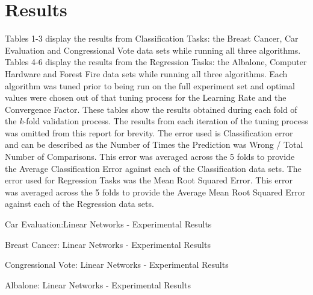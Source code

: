 \documentclass[twoside,11pt]{article}
\begin{document}
\newpage

\section{Results}
Tables 1-3 display the results from Classification Tasks: the Breast Cancer, Car Evaluation and Congressional Vote data sets while running all three algorithms. Tables 4-6 display the results from the Regression Tasks: the Albalone, Computer Hardware and Forest Fire data sets while running all three algorithms. Each algorithm was tuned prior to being run on the full experiment set and optimal values were chosen out of that tuning process for the Learning Rate and the Convergence Factor. These tables show the results obtained during each fold of the \textit{k}-fold validation process. The results from each iteration of the tuning process was omitted from this report for brevity. The error used is Classification error and can be described as the Number of Times the Prediction was Wrong / Total Number of Comparisons. This error was averaged across the 5 folds to provide the Average Classification Error against each of the Classification data sets. The error used for Regression Tasks was the Mean Root Squared Error. This error was averaged across the 5 folds to provide the Average Mean Root Squared Error against each of the Regression data sets.\newline


\begin{table}[h]
		\centering
		\caption{Car Evaluation:Linear Networks - Experimental Results}
		\label{tab:table1}
\end{table}

\begin{table}[h]
		\centering
		\caption{Breast Cancer: Linear Networks - Experimental Results}
		\label{tab:table2}
\end{table}
\newpage

\begin{table}[h]
		\centering
		\caption{Congressional Vote: Linear Networks - Experimental Results}
		\label{tab:table3}
\end{table}

\begin{table}[h]
	\centering
	\caption{Albalone: Linear Networks - Experimental Results}
	\label{tab:table4}
\end{table}
\end{document}
